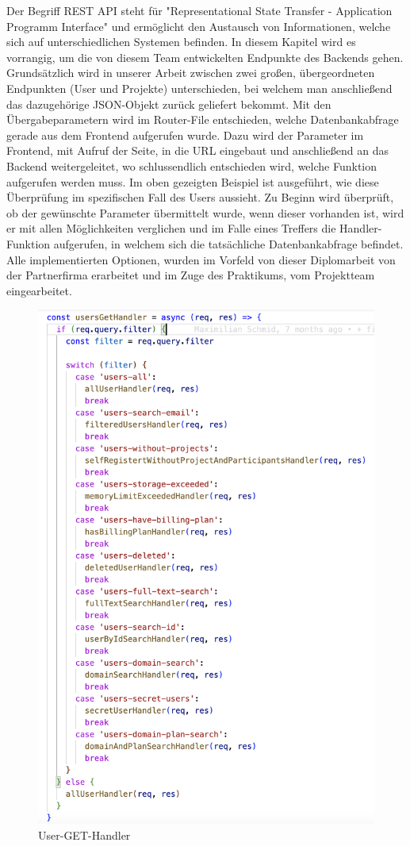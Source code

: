 Der Begriff REST API steht für "Representational State Transfer - Application Programm Interface" und ermöglicht den Austausch von Informationen, welche sich auf unterschiedlichen Systemen befinden. In diesem Kapitel wird es vorrangig, um die von diesem Team entwickelten Endpunkte des Backends gehen. Grundsätzlich wird in unserer Arbeit zwischen zwei großen, übergeordneten Endpunkten (User und Projekte) unterschieden, bei welchem man anschließend das dazugehörige JSON-Objekt zurück geliefert bekommt. Mit den Übergabeparametern wird im Router-File entschieden, welche Datenbankabfrage gerade aus dem Frontend aufgerufen wurde. Dazu wird der Parameter im Frontend, mit Aufruf der Seite, in die URL eingebaut und anschließend an das Backend weitergeleitet, wo schlussendlich entschieden wird, welche Funktion aufgerufen werden muss.
\newline
Im oben gezeigten Beispiel ist ausgeführt, wie diese Überprüfung im spezifischen Fall des Users aussieht. Zu Beginn wird überprüft, ob der gewünschte Parameter übermittelt wurde, wenn dieser vorhanden ist, wird er mit allen Möglichkeiten verglichen und im Falle eines Treffers die Handler-Funktion aufgerufen, in welchem sich die tatsächliche Datenbankabfrage befindet. Alle implementierten Optionen, wurden im Vorfeld von dieser Diplomarbeit von der Partnerfirma erarbeitet und im Zuge des Praktikums, vom Projektteam eingearbeitet.
\newline
\begin{figure}
    \centering
    \includegraphics[width=0.4\linewidth]{pics/REST_API_Img.png}
    \caption{User-GET-Handler}
    \label{fig:enter-label}
\end{figure}